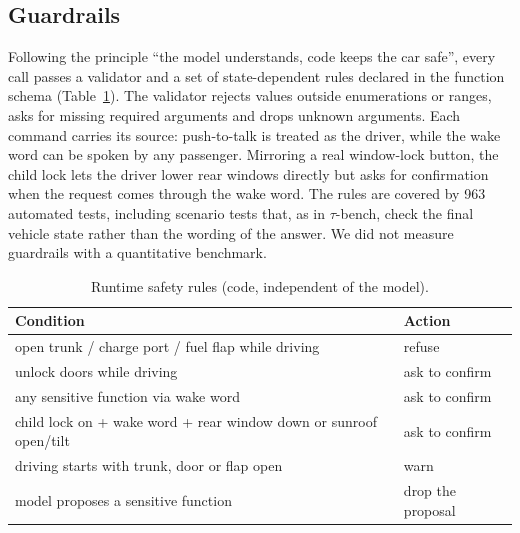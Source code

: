 \subsection{Guardrails}
\label{sec:guardrails}

Following the principle ``the model understands, code keeps the car safe'', every call passes a validator and a set of
state-dependent rules declared in the function schema (Table~\ref{tab:safety}). The validator rejects values outside
enumerations or ranges, asks for missing required arguments and drops unknown arguments. Each command carries its source:
push-to-talk is treated as the driver, while the wake word can be spoken by any passenger. Mirroring a real window-lock
button, the child lock lets the driver lower rear windows directly but asks for confirmation when the request comes through
the wake word. The rules are covered by 963 automated tests, including scenario tests that, as in $\tau$-bench, check the
final vehicle state rather than the wording of the answer. We did not measure guardrails with a quantitative benchmark.

\begin{table}[t]
\centering\small
\begin{tabular}{@{}p{3.6cm}p{3.1cm}@{}}
\toprule
Condition & Action \\
\midrule
open trunk / charge port / fuel flap while driving & refuse \\
unlock doors while driving & ask to confirm \\
any sensitive function via wake word & ask to confirm \\
child lock on + wake word + rear window down or sunroof open/tilt & ask to confirm \\
driving starts with trunk, door or flap open & warn \\
model proposes a sensitive function & drop the proposal \\
\bottomrule
\end{tabular}
\caption{Runtime safety rules (code, independent of the model).}
\label{tab:safety}
\end{table}
